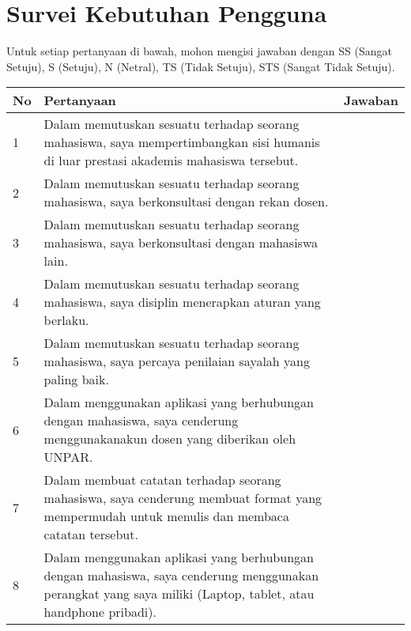 \chapter{Survei Kebutuhan Pengguna}
\label{surveikebutuhanpengguna}

Untuk setiap pertanyaan di bawah, mohon mengisi jawaban dengan SS (Sangat Setuju), S (Setuju), N (Netral), TS (Tidak Setuju), STS (Sangat Tidak Setuju).

\begin{table}[h]
\centering
\begin{tabular}{|l|p{13cm}|l|}
\hline
No & Pertanyaan                                                                                                                                                    & Jawaban \\ \hline
1  & Dalam memutuskan sesuatu terhadap seorang mahasiswa, saya mempertimbangkan sisi humanis di luar prestasi akademis mahasiswa tersebut.                         &         \\ \hline
2  & Dalam memutuskan sesuatu terhadap seorang mahasiswa, saya berkonsultasi dengan rekan dosen.                                                                   &         \\ \hline
3  & Dalam memutuskan sesuatu terhadap seorang mahasiswa, saya berkonsultasi dengan mahasiswa lain.                                                                &         \\ \hline
4  & Dalam memutuskan sesuatu terhadap seorang mahasiswa, saya disiplin menerapkan aturan yang berlaku.                                                            &         \\ \hline
5  & Dalam memutuskan sesuatu terhadap seorang mahasiswa, saya percaya penilaian sayalah yang paling baik.                                                         &         \\ \hline
6  & Dalam menggunakan aplikasi yang berhubungan dengan mahasiswa, saya cenderung menggunakanakun dosen yang diberikan oleh UNPAR.                                 &         \\ \hline
7  & Dalam membuat catatan terhadap seorang mahasiswa, saya cenderung membuat format yang mempermudah untuk menulis dan membaca catatan tersebut.                  &         \\ \hline
8  & Dalam menggunakan aplikasi yang berhubungan dengan mahasiswa, saya cenderung menggunakan perangkat yang saya miliki (Laptop, tablet, atau handphone pribadi). &         \\ \hline
\end{tabular}
\end{table}
